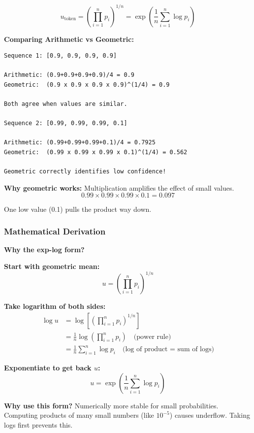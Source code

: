 \documentclass[12pt,a4paper]{article}
\theoremstyle{definition}
\begin{document}
\begin{equation}
u_{\text{token}} = \left(\prod_{i=1}^n p_i\right)^{1/n} = \exp\left(\frac{1}{n} \sum_{i=1}^n \log p_i\right)
\end{equation}

\begin{examplebox}
\textbf{Comparing Arithmetic vs Geometric:}

\begin{verbatim}
Sequence 1: [0.9, 0.9, 0.9, 0.9]

Arithmetic: (0.9+0.9+0.9+0.9)/4 = 0.9
Geometric:  (0.9 x 0.9 x 0.9 x 0.9)^(1/4) = 0.9

Both agree when values are similar.

Sequence 2: [0.99, 0.99, 0.99, 0.1]

Arithmetic: (0.99+0.99+0.99+0.1)/4 = 0.7925
Geometric:  (0.99 x 0.99 x 0.99 x 0.1)^(1/4) = 0.562

Geometric correctly identifies low confidence!
\end{verbatim}

\textbf{Why geometric works:} Multiplication amplifies the effect of small values.
\begin{equation}
0.99 \times 0.99 \times 0.99 \times 0.1 = 0.097
\end{equation}

One low value (0.1) pulls the product way down.
\end{examplebox}

\subsubsection{Mathematical Derivation}

\begin{proofbox}
\textbf{Why the exp-log form?}

\textbf{Start with geometric mean:}
\begin{equation}
u = \left(\prod_{i=1}^n p_i\right)^{1/n}
\end{equation}

\textbf{Take logarithm of both sides:}
\begin{align}
\log u &= \log\left[\left(\prod_{i=1}^n p_i\right)^{1/n}\right] \\
&= \frac{1}{n} \log\left(\prod_{i=1}^n p_i\right) \quad \text{(power rule)} \\
&= \frac{1}{n} \sum_{i=1}^n \log p_i \quad \text{(log of product = sum of logs)}
\end{align}

\textbf{Exponentiate to get back $u$:}
\begin{equation}
u = \exp\left(\frac{1}{n} \sum_{i=1}^n \log p_i\right)
\end{equation}

\textbf{Why use this form?} Numerically more stable for small probabilities. Computing products of many small numbers (like $10^{-5}$) causes underflow. Taking logs first prevents this.
\end{proofbox}
\end{document}
